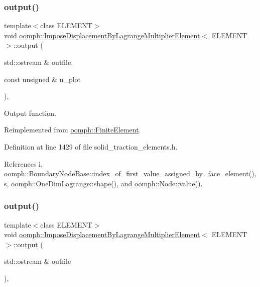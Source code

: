 \subsubsection{\texorpdfstring{output()}{output()}\hspace{0.1cm}{\footnotesize\ttfamily [1/2]}}
{\footnotesize\ttfamily template$<$class E\+L\+E\+M\+E\+NT$>$ \\
void \hyperlink{classoomph_1_1ImposeDisplacementByLagrangeMultiplierElement}{oomph\+::\+Impose\+Displacement\+By\+Lagrange\+Multiplier\+Element}$<$ E\+L\+E\+M\+E\+NT $>$\+::output (\begin{DoxyParamCaption}\item[{std\+::ostream \&}]{outfile,  }\item[{const unsigned \&}]{n\+\_\+plot }\end{DoxyParamCaption})\hspace{0.3cm}{\ttfamily [inline]}, {\ttfamily [virtual]}}



Output function. 



Reimplemented from \hyperlink{classoomph_1_1FiniteElement_afa9d9b2670f999b43e6679c9dd28c457}{oomph\+::\+Finite\+Element}.



Definition at line 1429 of file solid\+\_\+traction\+\_\+elements.\+h.



References i, oomph\+::\+Boundary\+Node\+Base\+::index\+\_\+of\+\_\+first\+\_\+value\+\_\+assigned\+\_\+by\+\_\+face\+\_\+element(), s, oomph\+::\+One\+Dim\+Lagrange\+::shape(), and oomph\+::\+Node\+::value().

\mbox{\label{classoomph_1_1ImposeDisplacementByLagrangeMultiplierElement_a5b3cc07419816463f67ec4ded04e2f66}} 
\subsubsection{\texorpdfstring{output()}{output()}\hspace{0.1cm}{\footnotesize\ttfamily [2/2]}}
{\footnotesize\ttfamily template$<$class E\+L\+E\+M\+E\+NT$>$ \\
void \hyperlink{classoomph_1_1ImposeDisplacementByLagrangeMultiplierElement}{oomph\+::\+Impose\+Displacement\+By\+Lagrange\+Multiplier\+Element}$<$ E\+L\+E\+M\+E\+NT $>$\+::output (\begin{DoxyParamCaption}\item[{std\+::ostream \&}]{outfile }\end{DoxyParamCaption})\hspace{0.3cm}{\ttfamily [inline]}, {\ttfamily [virtual]}}



